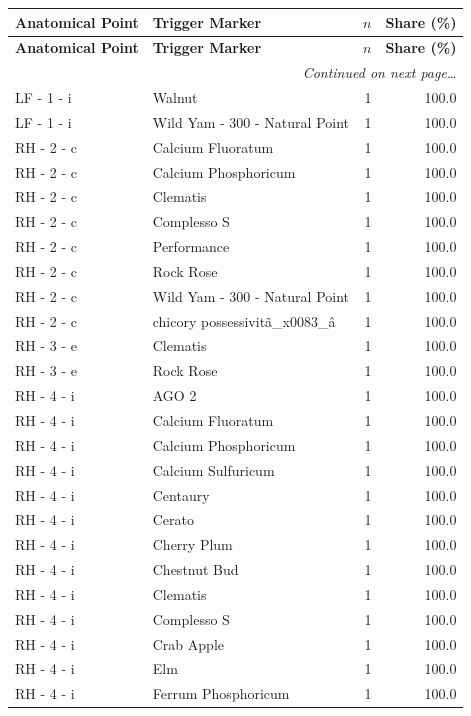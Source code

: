 \documentclass[a4paper,11pt]{article}
\begin{document}
\begin{footnotesize}
\begin{longtable}{p{3.5cm}p{7.5cm}rr}
\toprule
\textbf{Anatomical Point} &
\textbf{Trigger Marker} &
\textbf{$n$} &
\textbf{Share (\%)} \\
\midrule
\endfirsthead
\toprule
\textbf{Anatomical Point} &
\textbf{Trigger Marker} &
\textbf{$n$} &
\textbf{Share (\%)} \\
\midrule
\endhead
\midrule
\multicolumn{4}{r}{\footnotesize\emph{Continued on next page\ldots}} \\
\endfoot
\bottomrule
\endlastfoot
LF - 1 - i & Walnut & 1 & 100.0 \\
LF - 1 - i & Wild Yam - 300  - Natural Point & 1 & 100.0 \\
RH - 2 - c & Calcium Fluoratum & 1 & 100.0 \\
RH - 2 - c & Calcium Phosphoricum & 1 & 100.0 \\
RH - 2 - c & Clematis & 1 & 100.0 \\
RH - 2 - c & Complesso S & 1 & 100.0 \\
RH - 2 - c & Performance & 1 & 100.0 \\
RH - 2 - c & Rock Rose & 1 & 100.0 \\
RH - 2 - c & Wild Yam - 300  - Natural Point & 1 & 100.0 \\
RH - 2 - c & chicory possessivitã\_x0083\_â & 1 & 100.0 \\
RH - 3 - e & Clematis & 1 & 100.0 \\
RH - 3 - e & Rock Rose & 1 & 100.0 \\
RH - 4 - i & AGO 2 & 1 & 100.0 \\
RH - 4 - i & Calcium Fluoratum & 1 & 100.0 \\
RH - 4 - i & Calcium Phosphoricum & 1 & 100.0 \\
RH - 4 - i & Calcium Sulfuricum & 1 & 100.0 \\
RH - 4 - i & Centaury & 1 & 100.0 \\
RH - 4 - i & Cerato & 1 & 100.0 \\
RH - 4 - i & Cherry Plum & 1 & 100.0 \\
RH - 4 - i & Chestnut Bud & 1 & 100.0 \\
RH - 4 - i & Clematis & 1 & 100.0 \\
RH - 4 - i & Complesso S & 1 & 100.0 \\
RH - 4 - i & Crab Apple & 1 & 100.0 \\
RH - 4 - i & Elm & 1 & 100.0 \\
RH - 4 - i & Ferrum Phosphoricum & 1 & 100.0 \\

\end{longtable}
\end{footnotesize}
\end{document}
